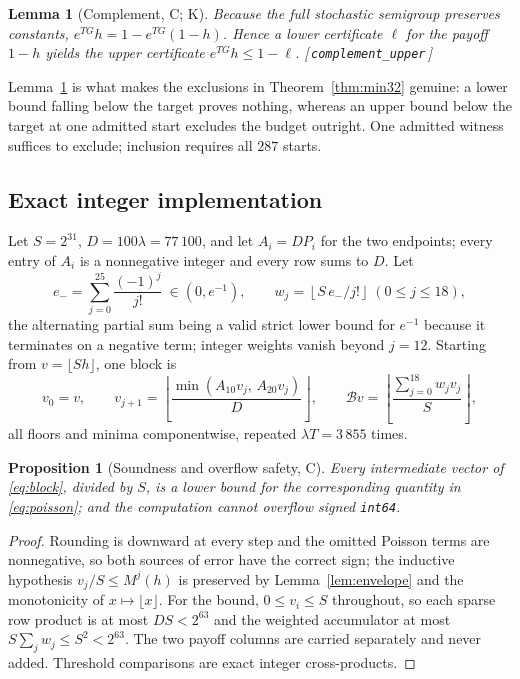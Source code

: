 \documentclass[11pt]{article}
\theoremstyle{plain}
\newtheorem{proposition}[theorem]{Proposition}
\newtheorem{lemma}[theorem]{Lemma}
\theoremstyle{definition}
\theoremstyle{remark}
\newcommand{\leanref}[1]{{\normalfont\sffamily\footnotesize[\,#1\,]}}
\newcommand{\Scale}{S}
\begin{document}
\begin{lemma}[Complement, C; K]\label{lem:complement}
Because the full stochastic semigroup preserves constants,
$e^{TG}h=1-e^{TG}(1-h)$. Hence a lower certificate $\ell$ for the payoff
$1-h$ yields the upper certificate $e^{TG}h\le1-\ell$.
\leanref{\texttt{complement\_upper}}
\end{lemma}

Lemma~\ref{lem:complement} is what makes the exclusions in
Theorem~\ref{thm:min32} genuine: a lower bound falling below the target proves
nothing, whereas an upper bound below the target at one admitted start
excludes the budget outright. One admitted witness suffices to exclude;
inclusion requires all $287$ starts.

\subsection{Exact integer implementation}\label{sec:integer}

Let $\Scale=2^{31}$, $D=100\lambda=77\,100$, and let $A_i=DP_i$ for the two
endpoints; every entry of $A_i$ is a nonnegative integer and every row sums to
$D$. Let
\begin{equation}
e_-=\sum_{j=0}^{25}\frac{(-1)^j}{j!}\ \in(0,e^{-1}),
\qquad w_j=\left\lfloor \Scale\,e_-/j!\right\rfloor\ (0\le j\le18),
\end{equation}
the alternating partial sum being a valid strict lower bound for $e^{-1}$
because it terminates on a negative term; integer weights vanish beyond
$j=12$. Starting from $v=\lfloor \Scale h\rfloor$, one block is
\begin{equation}\label{eq:block}
v_0=v,\qquad
v_{j+1}=\left\lfloor\frac{\min(A_{10}v_j,\,A_{20}v_j)}{D}\right\rfloor,
\qquad
\mathcal{B}v=\left\lfloor\frac{\sum_{j=0}^{18}w_jv_j}{\Scale}\right\rfloor,
\end{equation}
all floors and minima componentwise, repeated $\lambda T=3\,855$ times.

\begin{proposition}[Soundness and overflow safety, C]\label{prop:sound}
Every intermediate vector of \eqref{eq:block}, divided by $\Scale$, is a lower
bound for the corresponding quantity in \eqref{eq:poisson}; and the
computation cannot overflow signed \texttt{int64}.
\end{proposition}

\begin{proof}
Rounding is downward at every step and the omitted Poisson terms are
nonnegative, so both sources of error have the correct sign; the inductive
hypothesis $v_j/\Scale\le M^{j}(h)$ is preserved by
Lemma~\ref{lem:envelope} and the monotonicity of $x\mapsto\lfloor x\rfloor$.
For the bound, $0\le v_i\le \Scale$ throughout, so each sparse row product is
at most $D\Scale<2^{63}$ and the weighted accumulator at most
$\Scale\sum_j w_j\le \Scale^2<2^{63}$. The two payoff columns are carried
separately and never added. Threshold comparisons are exact integer
cross-products. \end{proof}
\end{document}
